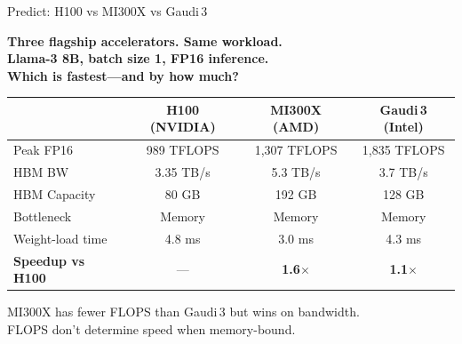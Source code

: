\documentclass[aspectratio=169, 12pt]{beamer}
\begin{document}
\begin{frame}[shrink]{Predict: H100 vs MI300X vs Gaudi\,3}

\centering
\Large\bfseries
Three flagship accelerators. Same workload.\\[0.3cm]
\normalsize
Llama-3 8B, batch size 1, FP16 inference.\\
Which is fastest---and by how much?\\[0.3cm]

\pause

\scriptsize
\begin{tabular}{lccc}
\toprule
              & \textbf{H100 (NVIDIA)} & \textbf{MI300X (AMD)} & \textbf{Gaudi\,3 (Intel)} \\
\midrule
Peak FP16     & 989 TFLOPS    & 1,307 TFLOPS  & 1,835 TFLOPS \\
HBM BW        & 3.35 TB/s     & 5.3 TB/s      & 3.7 TB/s \\
HBM Capacity  & 80 GB         & 192 GB        & 128 GB \\
\midrule
Bottleneck    & Memory        & Memory        & Memory \\
Weight-load time & 4.8 ms     & 3.0 ms        & 4.3 ms \\
\textbf{Speedup vs H100} & ---  & \textbf{1.6$\times$} & \textbf{1.1$\times$} \\
\bottomrule
\end{tabular}

\vspace{0.3cm}
\pause
\small
\alert{MI300X has fewer FLOPS than Gaudi\,3 but wins on bandwidth.\\
FLOPS don't determine speed when memory-bound.}
\end{frame}
\end{document}

